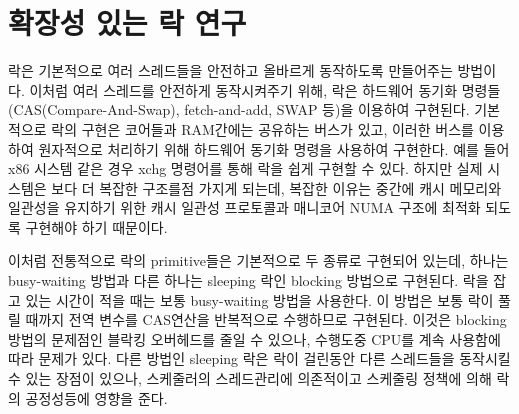 \newpage
\section{확장성 있는 락 연구}
\label{sec:lockrelated}

락은 기본적으로 여러 스레드들을 안전하고 올바르게 동작하도록 만들어주는 방법이다. 
이처럼 여러 스레드를 안전하게 동작시켜주기 위해, 락은 하드웨어 동기화 명령들(CAS(Compare-And-Swap),
fetch-and-add, SWAP 등)을 이용하여 구현된다.
기본적으로 락의 구현은 코어들과 RAM간에는 공유하는 버스가 있고, 이러한 버스를 이용하여 원자적으로 처리하기 위해 
하드웨어 동기화 명령을 사용하여 구현한다. 
예를 들어 x86 시스템 같은 경우 xchg 명령어를 통해 락을 쉽게 구현할 수 있다.
하지만 실제 시스템은 보다 더 복잡한 구조를점 가지게 되는데, 
복잡한 이유는 중간에 캐시 메모리와 일관성을 유지하기 위한 
캐시 일관성 프로토콜과 매니코어 NUMA 구조에 최적화 되도록 구현해야 하기 때문이다.


이처럼 전통적으로 락의 primitive들은 기본적으로 두 종류로 구현되어 있는데, 
하나는 busy-waiting 방법과 다른 하나는 sleeping 락인 blocking 방법으로 구현된다.
락을 잡고 있는 시간이 적을 때는 보통 busy-waiting 방법을 사용한다. 
이 방법은 보통 락이 풀릴 때까지 전역 변수를 CAS연산을 반복적으로 수행하므로 구현된다.
이것은 blocking 방법의 문제점인 블락킹 오버헤드를 줄일 수 있으나, 수행도중 CPU를 계속 사용함에 따라 문제가 있다.
다른 방법인 sleeping 락은 락이 걸린동안 다른 스레드들을 동작시킬 수 있는 장점이 있으나, 
스케줄러의 스레드관리에 의존적이고 스케줄링 정책에 의해 락의 공정성등에 영향을 준다.


